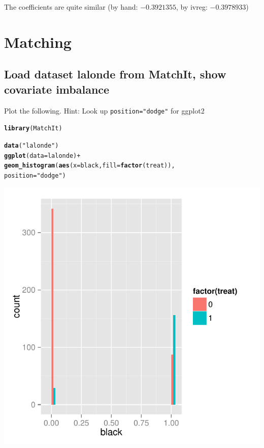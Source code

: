 \documentclass{article}\usepackage[]{graphicx}\usepackage[]{color}
\makeatletter
\def\maxwidth{ %
  \ifdim\Gin@nat@width>\linewidth
    \linewidth
  \else
    \Gin@nat@width
  \fi
}
\newcommand{\hlstr}[1]{\textcolor[rgb]{0.192,0.494,0.8}{#1}}%
\newcommand{\hlopt}[1]{\textcolor[rgb]{0,0,0}{#1}}%
\newcommand{\hlstd}[1]{\textcolor[rgb]{0.345,0.345,0.345}{#1}}%
\newcommand{\hlkwc}[1]{\textcolor[rgb]{0.333,0.667,0.333}{#1}}%
\newcommand{\hlkwd}[1]{\textcolor[rgb]{0.737,0.353,0.396}{\textbf{#1}}}%
\newenvironment{kframe}{%
 \def\at@end@of@kframe{}%
 \ifinner\ifhmode%
  \def\at@end@of@kframe{\end{minipage}}%
  \begin{minipage}{\columnwidth}%
 \fi\fi%
 \def\FrameCommand##1{\hskip\@totalleftmargin \hskip-\fboxsep
 \colorbox{shadecolor}{##1}\hskip-\fboxsep
     \hskip-\linewidth \hskip-\@totalleftmargin \hskip\columnwidth}%
 \MakeFramed {\advance\hsize-\width
   \@totalleftmargin\z@ \linewidth\hsize
   \@setminipage}}%
 {\par\unskip\endMakeFramed%
 \at@end@of@kframe}
\newenvironment{knitrout}{}{} %
\makeatother
\begin{document}
The coefficients are quite similar (by hand: \ensuremath{-0.3921355}, by ivreg: \ensuremath{-0.3978933})

\section{Matching}

\subsection{Load dataset lalonde from MatchIt, show covariate imbalance}

Plot the following. Hint: Look up \verb|position="dodge"| for ggplot2

\begin{knitrout}
\color{fgcolor}\begin{kframe}
\begin{alltt}
\hlkwd{library}\hlstd{(MatchIt)}
\end{alltt}


{\ttfamily\noindent\itshape\color{messagecolor}{\#\# Loading required package: MASS}}\begin{alltt}
\hlkwd{data}\hlstd{(}\hlstr{"lalonde"}\hlstd{)}
\hlkwd{ggplot}\hlstd{(}\hlkwc{data} \hlstd{= lalonde)} \hlopt{+}
  \hlkwd{geom_histogram}\hlstd{(}\hlkwd{aes}\hlstd{(}\hlkwc{x} \hlstd{= black,} \hlkwc{fill} \hlstd{=} \hlkwd{factor}\hlstd{(treat)),}
                 \hlkwc{position} \hlstd{=} \hlstr{"dodge"}\hlstd{)}
\end{alltt}


{\ttfamily\noindent\itshape\color{messagecolor}{\#\# stat\_bin: binwidth defaulted to range/30. Use 'binwidth = x' to adjust this.}}\end{kframe}
\includegraphics[width=\maxwidth]{figure/unnamed-chunk-7-1} 

\end{knitrout}
\end{document}
